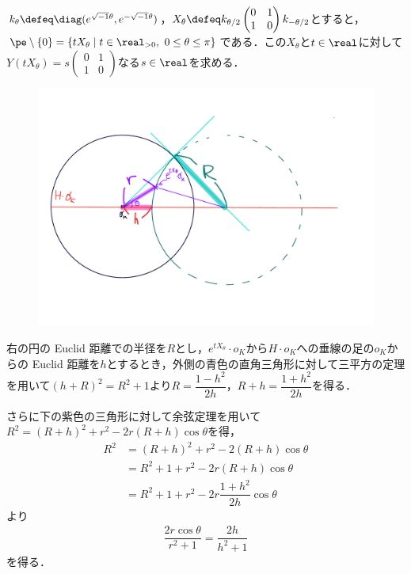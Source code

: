 \begin{npfwn}


  $k_{\theta} \defeq \diag(e^{\sqrt{-1}\theta},e^{-\sqrt{-1}\theta}) $，$X_{\theta} \defeq k_{\theta/2}
  \begin{pmatrix}
    0 & 1 \\ 1 & 0
  \end{pmatrix}
  k_{-\theta/2}$とすると，$\pe\setminus\{0\} =  \{tX_{\theta}\mid t\in \real_{>0},\ 0\leq \theta\leq \pi\}$である．この$X_{\theta} $と$t\in \real$に対して$Y(tX_{\theta} ) = s
  \begin{pmatrix}
    0 & 1 \\ 1 & 0
  \end{pmatrix}
  $なる$s\in \real $を求める．


  
  \begin{figure}[H]
    \centering
    \includegraphics[scale=0.35]{../graph/prob-eg-2.pdf}
    \caption{}
    \label{fig:prob-eg-1}
  \end{figure}

  右の円の Euclid 距離での半径を$R$とし，$e^{tX_{\theta}}\cdot o_K $から$H\cdot o_K$への垂線の足の$o_K$からの Euclid 距離を$h$とするとき，外側の青色の直角三角形に対して三平方の定理を用いて$(h+R)^2 = R^2 +  1 $より$R = \dfrac{1-h^2}{2h}$，$R+h = \dfrac{1+h^2}{2h}  $を得る．

  さらに下の紫色の三角形に対して余弦定理を用いて${R^2 = (R+h)^2 + r^2 - 2r(R+h)\cos\theta }$を得，
  \begin{align*}
    R^2 &= (R+h)^2 + r^2 - 2(R+h) \cos\theta \\
        &= R^2 +  1 + r^2 - 2r(R+h) \cos\theta \\
        &= R^2 +  1 + r^2 - 2r\dfrac{1+h^2}{2h} \cos\theta  
  \end{align*}
  より
  \begin{align}
    {\dfrac{2r\cos\theta}{r^2 + 1} = \dfrac{2h}{h^2 + 1} }\label{eq:1018-main}
  \end{align}
  を得る．


\end{npfwn}
